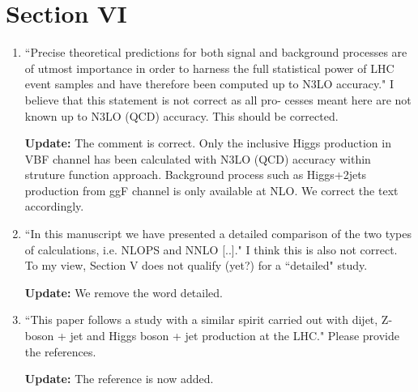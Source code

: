 \documentclass[12pt]{article}
\begin{document}
\section*{Section VI}
\begin{enumerate}
\item ``Precise theoretical predictions for both signal and background processes are of utmost importance in order to harness the full statistical power of LHC event samples and have therefore been computed up to N3LO accuracy." I believe that this statement is not correct as all pro- cesses meant here are not known up to N3LO (QCD) accuracy. This should be corrected.

{\bf Update:} The comment is correct. Only the inclusive Higgs production in VBF channel has been calculated with N3LO (QCD) accuracy within struture function approach. Background process such as Higgs+2jets production from ggF channel is only available at NLO. We correct the text accordingly. 

\item ``In this manuscript we have presented a detailed comparison of the two types of calculations, i.e. NLOPS and NNLO [..]." I think this is also not correct. To my view, Section V does not qualify (yet?) for a ``detailed" study.

{\bf Update:} We remove the word detailed.


\item ``This paper follows a study with a similar spirit carried out with dijet, Z-boson + jet and Higgs boson + jet production at the LHC." Please provide the references.

{\bf Update:} The reference is now added.
\end{enumerate}
\end{document}
